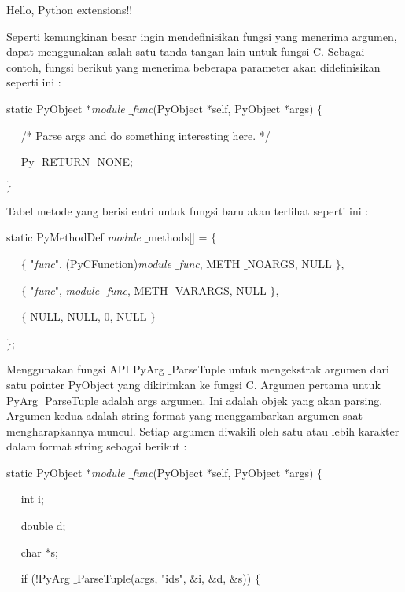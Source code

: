 \documentclass{wileySix}
\begin{document}
\begin{myEnumerate}
{\begin{myEnumerate}
\noindent 
Hello, Python extensions!! \par
\vspace{12pt}
Seperti kemungkinan besar ingin mendefinisikan fungsi yang menerima argumen, dapat menggunakan salah satu tanda tangan lain untuk fungsi C. Sebagai contoh, fungsi berikut yang menerima beberapa parameter akan didefinisikan seperti ini : \par
\noindent 
static PyObject *\textit{module $  \_  $func}(PyObject *self, PyObject *args)  $  \{  $ \par
\noindent 
~~ /* Parse args and do something interesting here. */ \par
\noindent 
~~ Py $  \_  $RETURN $  \_  $NONE; \par
\noindent 
$  \}  $ \par
\vspace{12pt}
Tabel metode yang berisi entri untuk fungsi baru akan terlihat seperti ini : \par
\noindent 
static PyMethodDef \textit{module} $  \_  $methods[] =  $  \{  $ \par
\noindent 
~~  $  \{  $ "\textit{func}", (PyCFunction)\textit{module $  \_  $func}, METH $  \_  $NOARGS, NULL  $  \}  $, \par
\noindent 
~~  $  \{  $ "\textit{func}", \textit{module $  \_  $func}, METH $  \_  $VARARGS, NULL  $  \}  $, \par
\noindent 
~~  $  \{  $ NULL, NULL, 0, NULL  $  \}  $ \par
\noindent 
$  \}  $; \par
\vspace{12pt}
Menggunakan fungsi API PyArg $  \_  $ParseTuple untuk mengekstrak argumen dari satu pointer PyObject yang dikirimkan ke fungsi C. Argumen pertama untuk PyArg $  \_  $ParseTuple adalah args argumen. Ini adalah objek yang akan parsing. Argumen kedua adalah string format yang menggambarkan argumen saat mengharapkannya muncul. Setiap argumen diwakili oleh satu atau lebih karakter dalam format string sebagai berikut : \par
\noindent 
static PyObject *\textit{module $  \_  $func}(PyObject *self, PyObject *args)  $  \{  $ \par
\noindent 
~~ int i; \par
\noindent 
~~ double d; \par
\noindent 
~~ char *s; \par
\vspace{12pt}
\noindent 
~~ if (!PyArg $  \_  $ParseTuple(args, "ids",  $  \&  $i,  $  \&  $d,  $  \&  $s))  $  \{  $ \par

\end{myEnumerate}}
\end{myEnumerate}
\end{document}
